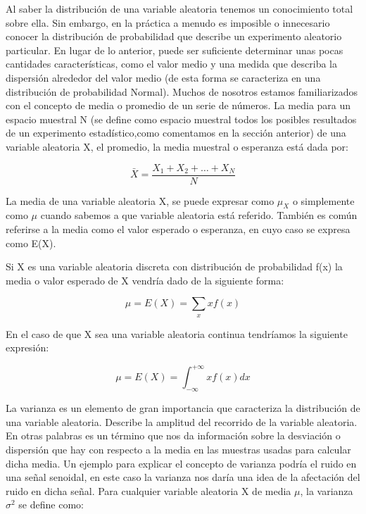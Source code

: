 Al saber la distribución de una variable aleatoria tenemos un conocimiento total sobre ella. 
Sin embargo, en la práctica a menudo es imposible o innecesario conocer la distribución de probabilidad que describe un experimento aleatorio particular. 
En lugar de lo anterior, puede ser suficiente determinar unas pocas cantidades características, como el valor medio y una medida que describa la dispersión alrededor del valor medio (de esta forma se caracteriza en una distribución de probabilidad Normal). 
Muchos de nosotros estamos familiarizados con el concepto de media o promedio de un serie de números. 
La media para un espacio muestral N (se define como espacio muestral todos los posibles resultados de un experimento estadístico,como comentamos en la sección anterior) de una variable aleatoria X, el promedio, la media muestral o esperanza está dada por:

\begin{equation}\label{mediamuestral}
\bar{X} = \frac{X_{1} + X_{2} + \dots + X_{N}}{N}
\end{equation}

La media de una variable aleatoria X, se puede expresar como $\mu_{X}$ o simplemente como $\mu$ cuando sabemos a que variable aleatoria está referido. 
También es común referirse a la media como el valor esperado o esperanza, en cuyo caso se expresa como E(X).

Si X es una variable aleatoria discreta con distribución de probabilidad f(x) la media o valor esperado de X vendría dado de la siguiente forma:

\begin{equation}\label{mediavariablealeatoriadiscreta}
\mu = E(X) = \sum_{x}xf(x) 
\end{equation}

En el caso de que X sea una variable aleatoria continua tendríamos la siguiente expresión:

\begin{equation}\label{mediavariablealeatoriacontinua}
\mu = E(X) = \int_{-\infty}^{+\infty}xf(x) dx
\end{equation}

La varianza es un elemento de gran importancia que caracteriza la distribución de una variable aleatoria. 
Describe la amplitud del recorrido de la variable aleatoria. 
En otras palabras es un término que nos da información sobre la desviación o dispersión que hay con respecto a la media en las muestras usadas para calcular dicha media.
Un ejemplo para explicar el concepto de varianza podría el ruido en una señal senoidal, en este caso la varianza nos daría una idea de la afectación del ruido en dicha señal. 
Para cualquier variable aleatoria X de media $\mu$, la varianza $\sigma^2$ se define como:

